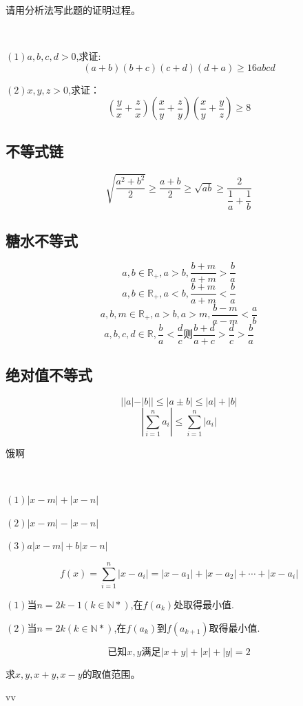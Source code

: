 \begin{zhu}
    请用分析法写此题的证明过程。
\end{zhu}
\clearpage
\begin{exercise}
    \ 

    $(1)a,b,c,d>0$,求证:
    \[(a+b)(b+c)(c+d)(d+a)\geq 16abcd\]

    $(2)x,y,z>0$,求证：
    \[(\frac{y}{x}+\frac{z}{x})(\frac{x}{y}+\frac{z}{y})(\frac{x}{y}+\frac{y}{z})\geq8\]

\end{exercise}
\clearpage
\subsection{不等式链}
\[\sqrt{\frac{a^2+b^2}{2}} \geq \frac{a+b}{2}\geq \sqrt{ab}\geq \frac{2}{\dfrac{1}{a}+\dfrac{1}{b}}\]

\clearpage
\subsection{糖水不等式}
\[a,b\in \mathbb{R}_+,a>b,\frac{b+m}{a+m}>\frac{b}{a}\]
\[a,b\in \mathbb{R}_+,a<b,\frac{b+m}{a+m}<\frac{b}{a}\]
\[a,b,m\in \mathbb{R}_+,a>b,a>m,\frac{b-m}{a-m}<\frac{a}{b}\]
\[a,b,c,d\in \mathbb{R} ,\frac{b}{a}<\frac{d}{c}\text{则}\frac{b+d}{a+c}>\frac{d}{c}>\frac{b}{a}\]

\clearpage
\subsection{绝对值不等式}
\begin{theorem}[绝对值不等式]
  \[||a|-|b||\leq|a\pm b|\leq |a|+|b|\]
  \[|\sum_{i=1}^{n}a_i|\leq\sum_{i=1}^{n}|a_i|\]  
\end{theorem}
\begin{corollary}
    饿啊
\end{corollary}
\begin{example}
    \ 

    $(1)$$|x-m|+|x-n|$

    $(2)$$|x-m|-|x-n|$

    $(3)$$a|x-m|+b|x-n|$
\end{example}
\begin{example}
    \[f(x)=\sum_{i=1}^{n}|x-a_i|=|x-a_1|+|x-a_2|+\cdots+|x-a_i|\]

    $(1)$当$n=2k-1(k\in \mathbb{N} *)$,在$f(a_k)$处取得最小值.

    $(2)$当$n=2k(k\in \mathbb{N} *)$,在$f(a_k)$到$f(a_{k+1})$取得最小值.
\end{example}
\begin{example}
    \[\text{已知}x,y\text{满足}|x+y|+|x|+|y|=2\]

    求$x,y,x+y,x-y$的取值范围。
\end{example}
\begin{definition}[距离空间]
    
\end{definition}
\begin{axiom}
    vv
\end{axiom}
\clearpage

